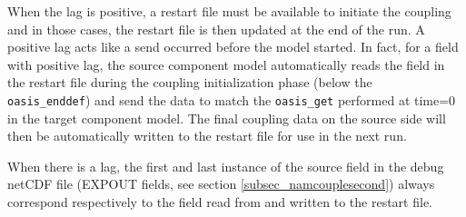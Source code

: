 When the lag is positive, a restart file must be available to initiate
the coupling and in those cases, the restart file is then updated at
the end of the run.  A positive lag acts like a send occurred before
the model started. In fact, for a field with positive lag, the source
component model automatically reads the field in the restart file
during the coupling initialization phase (below the {\tt
  oasis\_enddef}) and send the data to match the {\tt oasis\_get}
performed at time=0 in the target component model. The final coupling
data on the source side will then be automatically written to the
restart file for use in the next run.

When there is a lag, the first and last instance of the source field
in the debug netCDF file (EXPOUT fields, see section
\ref{subsec_namcouplesecond}) always correspond respectively to the
field read from and written to the restart file.
 
